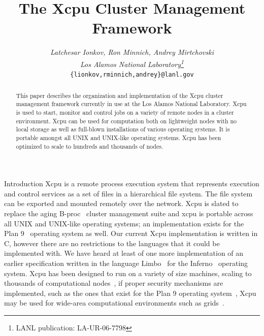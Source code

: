 \documentclass[11pt]{p9article}
\makeatletter
\renewcommand\section{\@startsection {section}{1}{\z@} {3pt} {1pt} {\normalfont\normalsize\bfseries}}
\makeatother
\begin{document}
\title{\Large\textbf{The Xcpu Cluster Management Framework}}
\author{\large 
	\begin{tabular}{c}
	\textsl{Latchesar Ionkov, Ron Minnich, Andrey Mirtchovski}\\
	\textsl{Los Alamos National Laboratory\footnote{LANL publication: LA-UR-06-7798}}\\
	\texttt{\{lionkov,rminnich,andrey\}@lanl.gov}\\
	\end{tabular}
}

\maketitle\thispagestyle{empty}
\pagestyle{empty}

\begin{abstract}

\setlength\parindent{0pt}
\setlength\parskip{0.25\baselineskip}

This paper describes the organization and implementation of the
Xcpu cluster management framework currently in use at the Los Alamos
National Laboratory. Xcpu is used to start, monitor and control
jobs on a variety of remote nodes in a cluster environment. Xcpu
can be used for computation both on lightweight nodes with no local
storage as well as full-blown installations of various operating
systems. It is portable amongst all UNIX and UNIX-like operating
systems. Xcpu has been optimized to scale to hundreds and thousands
of nodes.
\end{abstract}

\section{Introduction} 
Xcpu is a remote process execution system that represents execution
and control services as a set of files in a hierarchical file system.
The file system can be exported and mounted  remotely over the
network.  Xcpu is slated to replace the aging B-proc~\cite{choi-life}
cluster management suite and xcpu is portable across all UNIX and
UNIX-like operating systems; an implementation exists for the Plan
9~\cite{pike95plan} operating system as well. Our current Xcpu
implementation is written in C, however there are no restrictions
to the languages that it could be implemented with. We have heard
at least of one more implementation of an earlier specification
written in the language Limbo~\cite{limbo} for the Inferno~\cite{inferno}
operating system. Xcpu has been designed to run on a variety of
size machines, scaling to thousands of computational nodes~\cite{1019813},
if proper security mechanisms are implemented, such as the ones
that exist for the Plan 9 operating system~\cite{cox02security},
Xcpu may be used for wide-area computational environments such as
grids~\cite{mirtchovski04grid}.
\end{document}

